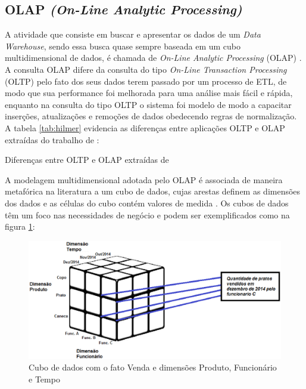 \subsection{OLAP \textit{(On-Line Analytic Processing)}}

A atividade que consiste em buscar e apresentar os dados de um \textit{Data Warehouse}, sendo essa busca quase sempre baseada em um cubo multidimensional de dados, é chamada de \textit{On-Line Analytic Processing} (OLAP) \cite{Kimball2002}. A consulta OLAP difere da consulta do tipo \textit{On-Line Transaction Processing} (OLTP) pelo fato dos seus dados terem passado por um processo de ETL, de modo que sua performance foi melhorada para uma análise mais fácil e rápida, enquanto na consulta do tipo OLTP o sistema foi modelo de modo a capacitar inserções, atualizações e remoções de dados obedecendo regras de normalização. A tabela \ref{tab:hilmer} evidencia as diferenças entre aplicações OLTP e OLAP extraídas do trabalho de : 

\begin{table}[!ht]
	\begin{center}
	
	 
	\caption{Diferenças entre OLTP e OLAP extraídas de \cite{hilmer2002}}
	\label{tab:hilmer}
	\end{center}
	\end{table}	
	\FloatBarrier	

A modelagem multidimensional adotada pelo OLAP é associada de maneira metafórica na literatura a um cubo de dados, cujas arestas definem as dimensões dos dados e as células do cubo contém valores de medida \cite{Kimball2002}. Os cubos de dados têm um foco nas necessidades de negócio e podem ser exemplificados como na figura \ref{fig:cubo}:

\begin{figure}[h!]
\centering
\includegraphics[keepaspectratio=false,scale=0.50]{figuras/figuras_matheus/cubo.eps}
\caption{Cubo de dados com o fato Venda e dimensões Produto, Funcionário e Tempo}
\label{fig:cubo}
\end{figure}
\FloatBarrier

